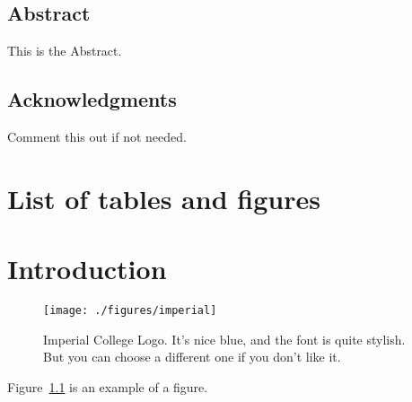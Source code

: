 \documentclass[12pt,oneside]{report}
\date{September 2023}
\begin{document}



\setcounter{page}{1}

\cleardoublepage
\section*{Abstract}
This is the Abstract.
\newpage

\section*{Acknowledgments}
Comment this out if not needed.
\newpage

\tableofcontents 


\setcounter{page}{1}
\fancyhead[LE,RO]{\slshape \rightmark}
\fancyhead[LO,RE]{\slshape \leftmark}





\chapter*{List of tables and figures}



\chapter{Introduction}

\begin{figure}[tb]
\centering
\texttt{[image: ./figures/imperial]}
\caption{Imperial College Logo. It's nice blue, and the font is quite stylish. But you can choose a different one if you don't like it.}
\label{fig:logo}
\end{figure}

Figure~\ref{fig:logo} is an example of a figure. 


\end{document}
